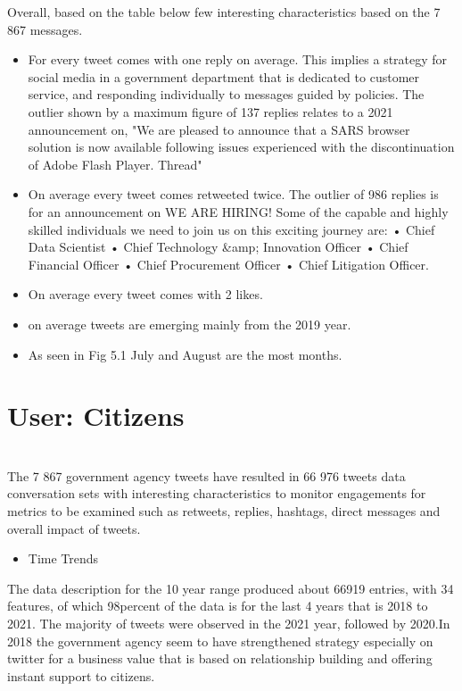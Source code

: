 Overall, based on the table below few interesting characteristics based on the 7 867 messages.
\begin{itemize}
    \item For every tweet comes with one reply on average. This implies a strategy for social media in a government department that is dedicated to customer service, and responding individually to messages guided by policies.  The outlier shown by a maximum figure of 137 replies relates to a 2021 announcement on,  "We are pleased to announce that a SARS browser solution is now available following issues experienced with the discontinuation of Adobe Flash Player. Thread"
    \item On average every tweet comes retweeted twice.  The outlier of 986 replies is for an announcement on WE ARE HIRING! Some of the capable and highly skilled individuals we need to join us on this exciting journey are: • Chief Data Scientist • Chief Technology &amp; Innovation Officer • Chief Financial Officer • Chief Procurement Officer • Chief Litigation Officer.
    \item On average every tweet comes with 2 likes.
    \item on average tweets are emerging mainly from the 2019 year.
    \item As seen in Fig 5.1 July and August are the most months.
\end{itemize}

\section{User: Citizens}\\

The 7 867 government agency tweets have resulted in 
66 976 tweets data conversation sets with interesting characteristics to monitor engagements for metrics to be examined such as retweets, replies, hashtags, direct messages and overall impact of tweets. 

\begin{itemize}
    \item Time Trends
\end{itemize}

The data description for the 10 year range produced about 66919 entries, with 34 features,  of which 98percent of the data  is for the last 4 years that is 2018 to 2021.  The majority of tweets were observed in the 2021 year, followed by 2020.In 2018 the government agency seem to have strengthened strategy especially on twitter for a business value that is based on relationship building and offering instant support to citizens.\\

